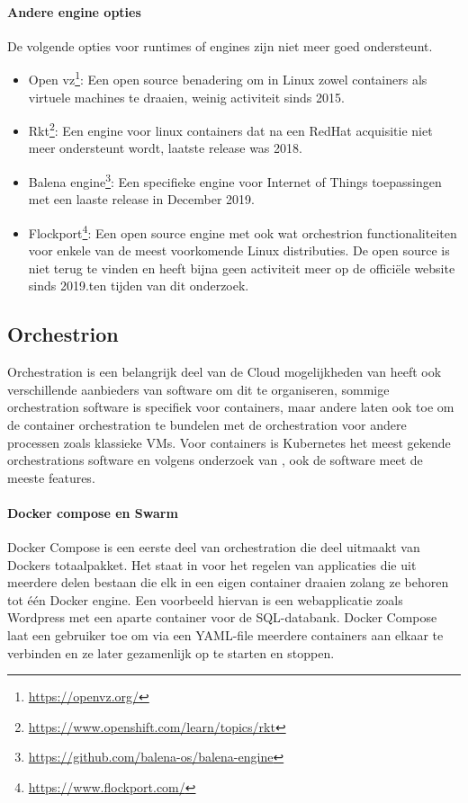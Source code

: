 \paragraph{Andere engine opties}
De volgende opties voor runtimes of engines zijn niet meer goed ondersteunt.
\begin{itemize}
    \item Open vz\footnote{\url{https://openvz.org/}}: Een open source benadering om in Linux zowel containers als virtuele machines te draaien, weinig activiteit sinds 2015.
    \item Rkt\footnote{\url{https://www.openshift.com/learn/topics/rkt}}: Een engine voor linux containers dat na een RedHat acquisitie niet meer ondersteunt wordt, laatste release was 2018.
    \item Balena engine\footnote{\url{https://github.com/balena-os/balena-engine}}: Een specifieke engine voor Internet of Things toepassingen met een laaste release in December 2019.
    \item Flockport\footnote{\url{https://www.flockport.com/}}: Een open source engine met ook wat orchestrion functionaliteiten voor enkele van de meest voorkomende Linux distributies. De open source is niet terug te vinden en heeft bijna geen activiteit meer op de officiële website sinds 2019.ten tijden van dit onderzoek.
\end{itemize}


\subsection{Orchestrion}
Orchestration is een belangrijk deel van de Cloud mogelijkheden van heeft ook verschillende aanbieders van software om dit te organiseren, sommige orchestration software is specifiek voor containers, maar andere laten ook toe om de container orchestration te bundelen met de orchestration voor andere processen zoals klassieke VMs. Voor containers is Kubernetes het meest gekende orchestrations software en volgens onderzoek van \textcite{Truyen2019}, ook de software meet de meeste features.  
\paragraph{Docker compose en Swarm}
Docker Compose is een eerste deel van orchestration die deel uitmaakt van Dockers totaalpakket. Het staat in voor het regelen van applicaties die uit meerdere delen bestaan die elk in een eigen container draaien zolang ze behoren tot één Docker engine. Een voorbeeld hiervan is een webapplicatie zoals Wordpress met een aparte container voor de SQL-databank.  Docker Compose laat een gebruiker toe om via een YAML-file meerdere containers aan elkaar te verbinden en ze later gezamenlijk op te starten en stoppen.

